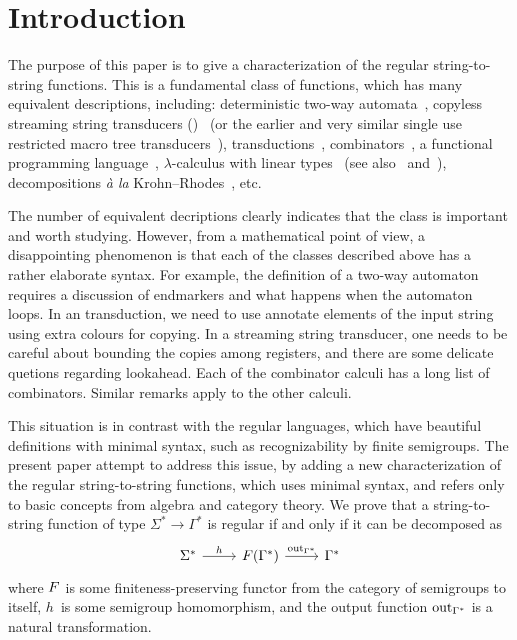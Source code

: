 \section{Introduction}
\label{sec:intro}

The purpose of this paper is to give a characterization of the regular string-to-string functions. This is a fundamental class of functions, which has many equivalent descriptions, including: deterministic two-way automata~\cite[Note~4]{shepherdson1959reduction}, copyless streaming string transducers (\sst)~\cite[Section~3]{alurExpressivenessStreamingString2010} (or the earlier and very similar single use restricted macro tree transducers~\cite[Section~5]{MacroMSO}), \mso transductions~\cite[Theorem~13]{engelfrietMSODefinableString2001}, combinators~\cite[Section~2]{alur2014regular}, a functional programming language~\cite[Section~6]{bojanczykRegularFirstOrderList2018}, $\lambda$-calculus with linear types~\cite[Theorem~3]{LambdaTransducer} (see also~\cite[Claim~6.2]{IATLC} and~\cite[Theorem~1.2.3]{titoPhD}), decompositions \textit{à la} Krohn--Rhodes~\cite[Theorem~18, item~4]{bojanczykstefanski2020}, etc.

The number of equivalent decriptions clearly indicates that the class is important and worth studying. However, from a mathematical point of view, a disappointing phenomenon is that each of the classes described above has a rather elaborate syntax. For example, the definition of a two-way automaton requires a discussion of endmarkers and what happens when the automaton loops. In an \mso transduction, we need to use annotate elements of the input string using extra colours for copying. In a streaming string transducer, one needs to be careful about bounding the copies among registers, and there are some delicate quetions regarding lookahead. Each of the combinator calculi has a long list of combinators. Similar remarks apply to the other calculi.

This situation is in contrast with the regular languages, which have beautiful definitions with minimal syntax, such as recognizability by finite semigroups. The present paper attempt to address this issue, by adding a new characterization of the regular string-to-string functions, which uses minimal syntax, and refers only to basic concepts from algebra and category theory. 
We prove that a string-to-string function of type $\Sigma^* \to \Gamma^*$ is regular
if and only if it can be decomposed as 
\[
\begin{tikzcd}
    \Sigma^* 
    \ar[r,"h"]
    & 
    \functor(\Gamma^*)
    \ar[r,"\outfun_{\Gamma^*}"]
    &
    \Gamma^*
\end{tikzcd}
\]
where $\functor$ is some finiteness-preserving functor from the category of semigroups to itself, $h$~is some semigroup homomorphism, and the output function $\mathrm{out}_{\Gamma^*}$ is a natural transformation.

